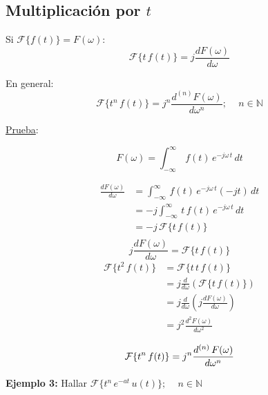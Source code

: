 \subsection{Multiplicación por $t$}
Si $\mathcal{F}\{f(t)\}=F(\omega)$:
\begin{equation*}
    \mathcal{F}\{t\,f(t)\}=j\frac{dF(\omega)}{d\omega}
\end{equation*}

En general:
\begin{equation}
    \mathcal{F}\{t^n\,f(t)\}=j^n\frac{d^{(n)}F(\omega)}{d\omega^n};
    \quad\,n\in\mathbb{N}
\end{equation}

\underline{Prueba}:

\begin{equation*}
    F(\omega)=\int_{-\infty}^\infty\,f(t)\,e^{-j\omega\,t}\,dt
\end{equation*}

\begin{equation*}
\begin{split}
    \frac{dF(\omega)}{d\omega}
        &=\int_{-\infty}^\infty\,f(t)\,e^{-j\omega\,t}(-jt)\,dt\\
        &=-j\int_{-\infty}^\infty\,t\,f(t)\,e^{-j\omega\,t}\,dt\\
        &=-j\,\mathcal{F}\{t\,f(t)\}\\
\end{split}
\end{equation*}
\begin{equation*}
    j\frac{dF(\omega)}{d\omega}=\mathcal{F}\{t\,f(t)\}
\end{equation*}
\begin{equation*}
\begin{split}
    \mathcal{F}\{t^2\,f(t)\}
        &=\mathcal{F}\{t\,t\,f(t)\}\\
        &=j\frac{d}{d\omega}\left(\mathcal{F}\{t\,f(t)\}\right)\\
        &=j\frac{d}{d\omega}\left(j\frac{dF(\omega)}{d\omega}\right)\\
        &=j^2\frac{d^2F(\omega)}{d\omega^2}\\
\end{split}
\end{equation*}
\begin{equation*}
    \mathcal{F}\{t^n\,f(t)\}=j^n\frac{d^{(n)}\,F(\omega)}{d\omega^n}\\
\end{equation*}

\textbf{Ejemplo 3:} Hallar $\mathcal{F}\{t^n\,e^{-at}\,u(t)\};
\quad\,n\in\mathbb{N}$

